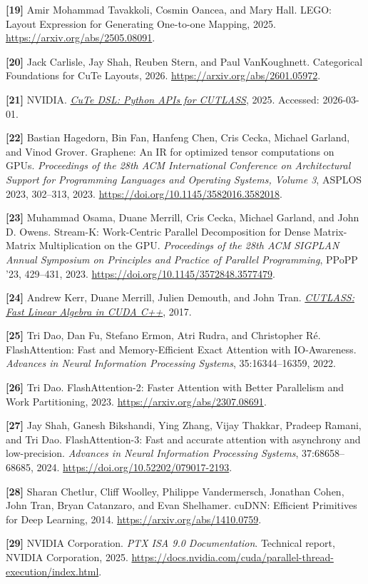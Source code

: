 \noindent\textbf{[19]} Amir Mohammad Tavakkoli, Cosmin Oancea, and Mary Hall. LEGO: Layout Expression
for Generating One-to-one Mapping, 2025. \url{https://arxiv.org/abs/2505.08091}.

\noindent\textbf{[20]} Jack Carlisle, Jay Shah, Reuben Stern, and Paul VanKoughnett. Categorical
Foundations for CuTe Layouts, 2026. \url{https://arxiv.org/abs/2601.05972}.

\noindent\textbf{[21]} NVIDIA. \href{https://docs.nvidia.com/cutlass/latest/media/docs/pythonDSL/cute_dsl.html}{\emph{CuTe DSL: Python APIs for CUTLASS}}, 2025. Accessed: 2026-03-01.

\noindent\textbf{[22]} Bastian Hagedorn, Bin Fan, Hanfeng Chen, Cris Cecka, Michael Garland,
and Vinod Grover. Graphene: An IR for optimized tensor computations on GPUs.
\emph{Proceedings of the 28th ACM International Conference on Architectural
Support for Programming Languages and Operating Systems, Volume 3}, ASPLOS 2023,
302--313, 2023. \url{https://doi.org/10.1145/3582016.3582018}.

\noindent\textbf{[23]} Muhammad Osama, Duane Merrill, Cris Cecka, Michael Garland, and John D. Owens.
Stream-K: Work-Centric Parallel Decomposition for Dense Matrix-Matrix
Multiplication on the GPU. \emph{Proceedings of the 28th ACM SIGPLAN Annual
Symposium on Principles and Practice of Parallel Programming}, PPoPP '23,
429--431, 2023. \url{https://doi.org/10.1145/3572848.3577479}.

\noindent\textbf{[24]} Andrew Kerr, Duane Merrill, Julien Demouth, and John Tran.
\href{https://developer.nvidia.com/blog/cutlass-linear-algebra-cuda}{\emph{CUTLASS: Fast Linear Algebra in CUDA C++}}, 2017.

\noindent\textbf{[25]} Tri Dao, Dan Fu, Stefano Ermon, Atri Rudra, and Christopher R\'e.
FlashAttention: Fast and Memory-Efficient Exact Attention with IO-Awareness.
\emph{Advances in Neural Information Processing Systems}, 35:16344--16359, 2022.

\noindent\textbf{[26]} Tri Dao. FlashAttention-2: Faster Attention with Better Parallelism and Work
Partitioning, 2023. \url{https://arxiv.org/abs/2307.08691}.

\noindent\textbf{[27]} Jay Shah, Ganesh Bikshandi, Ying Zhang, Vijay Thakkar, Pradeep Ramani,
and Tri Dao. FlashAttention-3: Fast and accurate attention with asynchrony and
low-precision. \emph{Advances in Neural Information Processing Systems},
37:68658--68685, 2024. \url{https://doi.org/10.52202/079017-2193}.

\noindent\textbf{[28]} Sharan Chetlur, Cliff Woolley, Philippe Vandermersch, Jonathan Cohen,
John Tran, Bryan Catanzaro, and Evan Shelhamer. cuDNN: Efficient Primitives
for Deep Learning, 2014. \url{https://arxiv.org/abs/1410.0759}.

\noindent\textbf{[29]} NVIDIA Corporation. \emph{PTX ISA 9.0 Documentation}. Technical report,
NVIDIA Corporation, 2025.
\url{https://docs.nvidia.com/cuda/parallel-thread-execution/index.html}.

